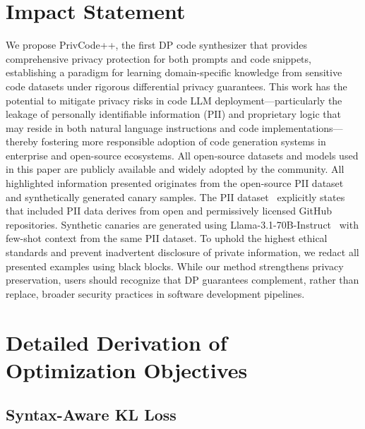 \documentclass{article}
\theoremstyle{plain}
\theoremstyle{definition}
\theoremstyle{remark}
\def \toolname{PrivCode++}
\begin{document}
{\section*{Impact Statement}

We propose \toolname, the first DP code synthesizer that provides comprehensive privacy protection for both prompts and code snippets, establishing a paradigm for learning domain-specific knowledge from sensitive code datasets under rigorous differential privacy guarantees. This work has the potential to mitigate privacy risks in code LLM deployment—particularly the leakage of personally identifiable information (PII) and proprietary logic that may reside in both natural language instructions and code implementations—thereby fostering more responsible adoption of code generation systems in enterprise and open-source ecosystems. All open-source datasets and models used in this paper are publicly available and widely adopted by the community. All highlighted information presented originates from the open-source PII dataset~\cite{santacoder} and synthetically generated canary samples. The PII dataset~\cite{santacoder} explicitly states that included PII data derives from open and permissively licensed GitHub repositories. Synthetic canaries are generated using Llama-3.1-70B-Instruct~\cite{patterson2022carbonfootprintmachinelearning} with few-shot context from the same PII dataset. To uphold the highest ethical standards and prevent inadvertent disclosure of private information, we redact all presented examples using black blocks. While our method strengthens privacy preservation, users should recognize that DP guarantees complement, rather than replace, broader security practices in software development pipelines.










\newpage
\appendix
\onecolumn


\section{Detailed Derivation of Optimization Objectives}
\label{app:objectives}

\subsection{Syntax-Aware KL Loss}
\label{app:ast loss}

}
\end{document}
